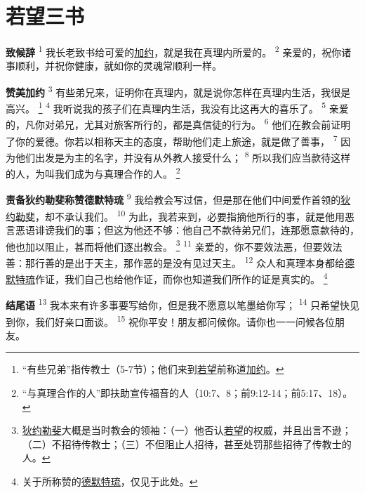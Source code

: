 \chapter*{若望三书}


\textbf{致候辞\quad}
\textsuperscript{1}
我长老致书给可爱的\uline{加约}，就是我在真理内所爱的。
\textsuperscript{2}
亲爱的，祝你诸事顺利，并祝你健康，就如你的灵魂常顺利一样。

\textbf{赞美加约\quad}
\textsuperscript{3}
有些弟兄来，证明你在真理内，就是说你怎样在真理内生活，我很是高兴。
\renewcommand\thefootnote{\ding{\numexpr171+\value{footnote}}}
\footnote{“有些兄弟”指传教士（5-7节）；他们来到\uline{若望}前称道\uline{加约}。}
\textsuperscript{4}
我听说我的孩子们在真理内生活，我没有比这再大的喜乐了。
\textsuperscript{5}
亲爱的，凡你对弟兄，尤其对旅客所行的，都是真信徒的行为。
\textsuperscript{6}
他们在教会前证明了你的爱德。你若以相称天主的态度，帮助他们走上旅途，就是做了善事，
\textsuperscript{7}
因为他们出发是为主的名字，并没有从外教人接受什么；
\textsuperscript{8}
所以我们应当款待这样的人，为叫我们成为与真理合作的人。
\footnote{“与真理合作的人”即扶助宣传福音的人（10:7、8；前9:12-14；前5:17、18）。}

\textbf{责备狄约勒斐称赞德默特琉\quad}
\textsuperscript{9}
我给教会写过信，但是那在他们中间爱作首领的\uline{狄约勒斐}，却不承认我们。
\textsuperscript{10}
为此，我若来到，必要指摘他所行的事，就是他用恶言恶语诽谤我们的事；但这为他还不够：他自己不款待弟兄们，连那愿意款待的，他也加以阻止，甚而将他们逐出教会。
\footnote{\uline{狄约勒斐}大概是当时教会的领袖：（一）他否认\uline{若望}的权威，并且出言不逊；（二）不招待传教士；（三）不但阻止人招待，甚至处罚那些招待了传教士的人。}
\textsuperscript{11}
亲爱的，你不要效法恶，但要效法善：那行善的是出于天主，那作恶的是没有见过天主。
\textsuperscript{12}
众人和真理本身都给\uline{德默特琉}作证，我们自己也给他作证，而你也知道我们所作的证是真实的。
\footnote{关于所称赞的\uline{德默特琉}，仅见于此处。}

\textbf{结尾语\quad}
\textsuperscript{13}
我本来有许多事要写给你，但是我不愿意以笔墨给你写；
\textsuperscript{14}
只希望快见到你，我们好亲口面谈。
\textsuperscript{15}
祝你平安！朋友都问候你。请你也一一问候各位朋友。
